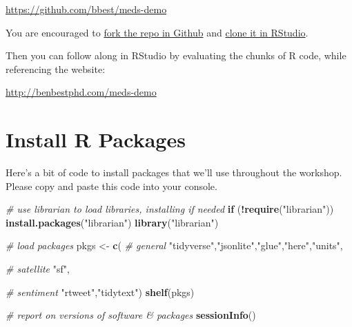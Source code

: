 \documentclass[]{book}
\newenvironment{Shaded}{\begin{snugshade}}{\end{snugshade}}
\newcommand{\CommentTok}[1]{\textcolor[rgb]{0.56,0.35,0.01}{\textit{#1}}}
\newcommand{\ControlFlowTok}[1]{\textcolor[rgb]{0.13,0.29,0.53}{\textbf{#1}}}
\newcommand{\KeywordTok}[1]{\textcolor[rgb]{0.13,0.29,0.53}{\textbf{#1}}}
\newcommand{\NormalTok}[1]{#1}
\newcommand{\OperatorTok}[1]{\textcolor[rgb]{0.81,0.36,0.00}{\textbf{#1}}}
\newcommand{\StringTok}[1]{\textcolor[rgb]{0.31,0.60,0.02}{#1}}
\begin{document}
\url{https://github.com/bbest/meds-demo}

You are encouraged to \href{https://help.github.com/en/github/getting-started-with-github/fork-a-repo}{fork the repo in Github} and \href{https://happygitwithr.com/rstudio-git-github.html\#clone-the-new-github-repository-to-your-computer-via-rstudio}{clone it in RStudio}.

Then you can follow along in RStudio by evaluating the chunks of R code, while referencing the website:

\url{http://benbestphd.com/meds-demo}

\hypertarget{install-r-packages}{%
\section{Install R Packages}\label{install-r-packages}}

Here's a bit of code to install packages that we'll use throughout the workshop. Please copy and paste this code into your console.

\begin{Shaded}
\begin{Highlighting}[]
\CommentTok{# use librarian to load libraries, installing if needed}
\ControlFlowTok{if}\NormalTok{ (}\OperatorTok{!}\KeywordTok{require}\NormalTok{(}\StringTok{"librarian"}\NormalTok{)) }\KeywordTok{install.packages}\NormalTok{(}\StringTok{"librarian"}\NormalTok{)}
\KeywordTok{library}\NormalTok{(}\StringTok{"librarian"}\NormalTok{)}

\CommentTok{# load packages}
\NormalTok{pkgs <-}\StringTok{ }\KeywordTok{c}\NormalTok{(}
  \CommentTok{# general}
  \StringTok{"tidyverse"}\NormalTok{,}\StringTok{"jsonlite"}\NormalTok{,}\StringTok{"glue"}\NormalTok{,}\StringTok{"here"}\NormalTok{,}\StringTok{"units"}\NormalTok{,}

  \CommentTok{# satellite}
  \StringTok{"sf"}\NormalTok{,}
  
  \CommentTok{# sentiment}
  \StringTok{"rtweet"}\NormalTok{,}\StringTok{"tidytext"}\NormalTok{)}
\KeywordTok{shelf}\NormalTok{(pkgs)}

\CommentTok{# report on versions of software & packages}
\KeywordTok{sessionInfo}\NormalTok{()}
\end{Highlighting}
\end{Shaded}
\end{document}
